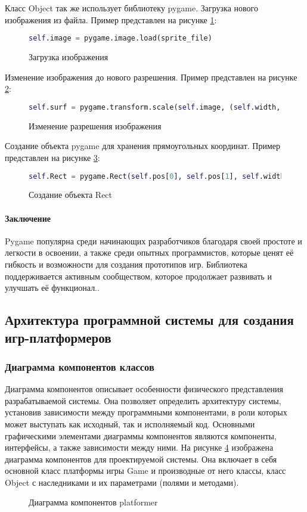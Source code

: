 Класс Object так же использует библиотеку pygame. 
Загрузка нового изображения из файла.
Пример представлен на рисунке \ref{imageload:image}:
\begin{figure}[H]
	\begin{lstlisting}[language=Python]
		self.image = pygame.image.load(sprite_file)
	\end{lstlisting}  
	\caption{Загрузка изображения}
	\label{imageload:image}
\end{figure}	
Изменение изображения до нового разрешения.
Пример представлен на рисунке \ref{transform:image}:
\begin{figure}[H]
	\begin{lstlisting}[language=Python]
		self.surf = pygame.transform.scale(self.image, (self.width, self.height))
	\end{lstlisting}  
	\caption{Изменение разрешения изображения}
	\label{transform:image}
\end{figure}	
Создание объекта pygame для хранения прямоугольных координат.
Пример представлен на рисунке \ref{rect:image}:
\begin{figure}[H]
	\begin{lstlisting}[language=Python]
		self.Rect = pygame.Rect(self.pos[0], self.pos[1], self.width, self.height)
	\end{lstlisting}  
	\caption{Создание объекта Rect}
	\label{rect:image}
\end{figure}	
					
\paragraph{Заключение}
Pygame популярна среди начинающих разработчиков благодаря своей простоте и легкости в освоении, а также среди опытных программистов, которые ценят её гибкость и возможности для создания прототипов игр. Библиотека поддерживается активным сообществом, которое продолжает развивать и улучшать её функционал..

\subsection{Архитектура программной системы для создания игр-платформеров}
\subsubsection{Диаграмма компонентов классов}
Диаграмма компонентов описывает особенности физического представления разрабатываемой системы. Она позволяет определить архитектуру системы, установив зависимости между программными компонентами, в роли которых может выступать как исходный, так и исполняемый код. Основными графическими элементами диаграммы компонентов являются компоненты, интерфейсы, а также зависимости между ними. На рисунке \ref{platformer:image} изображена диаграмма компонентов для проектируемой системы. Она включает в себя основной класс платформы игры Game и производные от него классы, класс Object с наследниками и их параметрами (полями и методами).
\begin{figure}[H]
	\caption{Диаграмма компонентов platformer}
	\label{platformer:image}
\end{figure}
